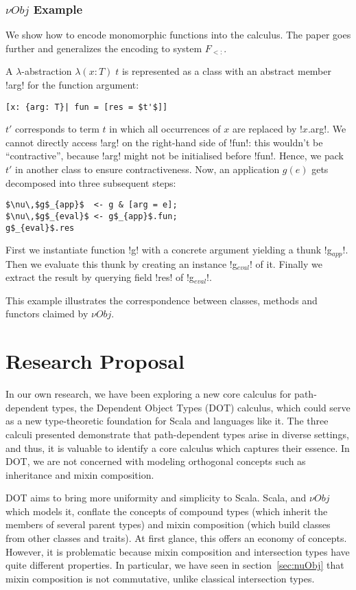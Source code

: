 \documentclass[10pt,journal,a4paper]{IEEEtran}
\begin{document}
\subsubsection*{${\nu}Obj$ Example}

We show how to encode monomorphic functions into the
calculus. The paper goes further and generalizes the encoding to
system $F_{<:}$.

A $\lambda$-abstraction $\lambda ( x : T )\; t$ is represented as a
class with an abstract member \code!arg! for the function argument:
\begin{lstlisting}
[x: {arg: T}| fun = [res = $t'$]]
\end{lstlisting}
$t'$ corresponds to term $t$ in which all occurrences of $x$ are
replaced by \code!$x$.arg!. We cannot directly access \code!arg! on
the right-hand side of \code!fun!: this wouldn't be ``contractive'',
because \code!arg! might not be initialised before \code!fun!. Hence,
we pack $t'$ in another class to ensure contractiveness. Now, an
application $g(e)$ gets decomposed into three subsequent steps:
\begin{lstlisting}
$\nu\,$g$_{app}$  <- g & [arg = e];
$\nu\,$g$_{eval}$ <- g$_{app}$.fun;
g$_{eval}$.res
\end{lstlisting}
First we instantiate function \code!g! with a concrete argument
yielding a thunk \code!g$_{app}$!. Then we evaluate this thunk by
creating an instance \code!g$_{eval}$! of it. Finally we extract the
result by querying field \code!res! of \code!g$_{eval}$!.

This example illustrates the correspondence between classes, methods
and functors claimed by ${\nu}Obj$.

\section{Research Proposal}\label{proposal}%

In our own research, we have been exploring a new core calculus for
path-dependent types, the Dependent Object Types (DOT) calculus, which
could serve as a new type-theoretic foundation for Scala and languages
like it. The three calculi presented demonstrate that path-dependent
types arise in diverse settings, and thus, it is valuable to identify
a core calculus which captures their essence. In DOT, we are not
concerned with modeling orthogonal concepts such as inheritance and
mixin composition.

DOT aims to bring more uniformity and simplicity to Scala. Scala, and
${\nu}Obj$ which models it, conflate the concepts of compound types
(which inherit the members of several parent types) and mixin
composition (which build classes from other classes and traits). At
first glance, this offers an economy of concepts. However, it is
problematic because mixin composition and intersection types have
quite different properties. In particular, we have seen in
section~\ref{sec:nuObj} that mixin composition is not commutative,
unlike classical intersection types.
\end{document}
